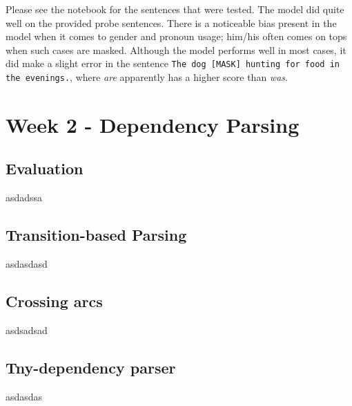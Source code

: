 \documentclass[a4paper, 11pt]{article}
\begin{document}
Please see the notebook for the sentences that were tested. The model did quite well on the provided probe sentences. There is a noticeable bias present in the model when it comes to gender and pronoun usage; him/his often comes on tops when such cases are masked. Although the model performs well in most cases, it did make a slight error in the sentence \texttt{The dog [MASK] hunting for food in the evenings.}, where \textit{are} apparently has a higher score than \textit{was}. 

\section{Week 2 - Dependency Parsing}

\subsection{Evaluation}

asdadssa

\subsection{Transition-based Parsing}

asdasdasd

\subsection{Crossing arcs}

asdsadsad

\subsection{Tny-dependency parser}

asdasdas
\end{document}
